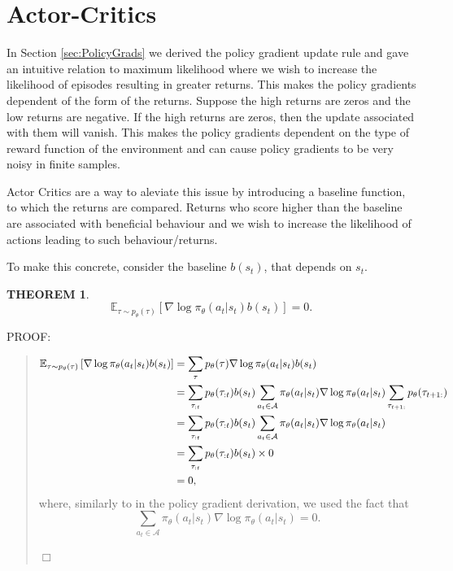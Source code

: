 \documentclass{report}
\newtheorem{theorem}{THEOREM}
\newenvironment{proof}{
PROOF:
\begin{quotation}}{
$\Box$ \end{quotation}}
\numberwithin{equation}{section}
\numberwithin{figure}{section}
\numberwithin{table}{section}
\numberwithin{algorithm}{section}
\begin{document}
\section{Actor-Critics}\label{sec:ActorCritic}
In Section \ref{sec:PolicyGrads} we derived the policy gradient 
update rule and gave an intuitive relation to maximum likelihood 
where we wish to increase the likelihood of episodes resulting 
in greater returns. This makes the policy gradients dependent of 
the form of the returns. Suppose the high returns are zeros and 
the low returns are negative. If the high returns are zeros, then 
the update associated with them will vanish. This makes the policy 
gradients dependent on the type of reward function of the environment 
and can cause policy gradients to be very noisy in finite samples.

Actor Critics \citep{Tsitsiklis} are a way to aleviate this issue 
by introducing a baseline function, to which the returns are compared.
Returns who score higher than the baseline are associated with 
beneficial behaviour and we wish to increase the likelihood 
of actions leading to such behaviour/returns.

To make this concrete, consider the baseline $b(s_t)$, that depends 
on $s_t$.

\begin{theorem}\label{thm:baselineThm}
  \begin{equation*}
    \mathbb{E}_{\tau\sim p_\theta(\tau)}\left[\nabla \log \pi_\theta(a_t|s_t)
    b(s_t)\right]=0.  
  \end{equation*}
\end{theorem}

\begin{proof}
  \begin{align}
    \mathbb{E}_{\tau\sim p_\theta(\tau)}\left[\nabla \log \pi_\theta(a_t|s_t)
    b(s_t)\right]&= \sum_{\tau}p_\theta(\tau)\nabla \log\pi_\theta(a_t|s_t)b(s_t)\notag\\
    &=\sum_{\tau_{:t}}p_\theta(\tau_{:t})b(s_t)\sum_{a_t\in\mathcal{A}}\pi_\theta(a_t|s_t)\nabla \log\pi_\theta(a_t|s_t) \sum_{\tau_{t+1:}}p_\theta(\tau_{t+1:})\notag\\
    &=\sum_{\tau_{:t}}p_\theta(\tau_{:t})b(s_t)\sum_{a_t\in\mathcal{A}}\pi_\theta(a_t|s_t)\nabla \log\pi_\theta(a_t|s_t)\notag\\
    &=\sum_{\tau_{:t}}p_\theta(\tau_{:t})b(s_t)\times 0\notag\\
    &=0,
  \end{align}
  where, similarly to in the policy gradient derivation, we used the fact that 
  \begin{equation*}
    \sum_{a_t\in\mathcal{A}}\pi_\theta(a_t|s_t)\nabla \log\pi_\theta(a_t|s_t)=0. 
  \end{equation*}
\end{proof}
\end{document}
